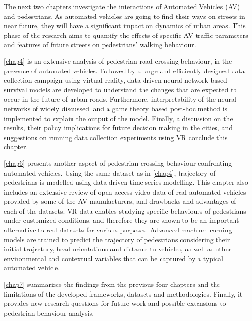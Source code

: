 The next two chapters investigate the interactions of Automated Vehicles (AV) and pedestrians. As automated vehicles are going to find their ways on streets in near future, they will have a significant impact on dynamics of urban areas. This phase of the research aims to quantify the effects of specific AV traffic parameters and features of future streets on pedestrians' walking behaviour.

\cref{chap4} is an extensive analysis of pedestrian road crossing behaviour, in the presence of automated vehicles. Followed by a large and efficiently designed data collection campaign using virtual reality, data-driven neural network-based survival models are developed to understand the changes that are expected to occur in the future of urban roads. Furthermore, interpretability of the neural networks of widely discussed, and a game theory based post-hoc method is implemented to explain the output of the model. Finally, a discussion on the results, their policy implications for future decision making in the cities, and suggestions on running data collection experiments using VR conclude this chapter.

\cref{chap6} presents another aspect of pedestrian crossing behaviour confronting automated vehicles. Using the same dataset as in \cref{chap4}, trajectory of pedestrians is modelled using data-driven time-series modelling. This chapter also includes an extensive review of open-access video data of real automated vehicles provided by some of the AV manufacturers, and drawbacks and advantages of each of the datasets. VR data enables studying specific behaviours of pedestrians under customized conditions, and therefore they are shown to be an important alternative to real datasets for various purposes. Advanced machine learning models are trained to predict the trajectory of pedestrians considering their initial trajectory, head orientations and distance to vehicles, as well as other environmental and contextual variables that can be captured by a typical automated vehicle. 

\cref{chap7} summarizes the findings from the previous four chapters and the limitations of the developed frameworks, datasets and methodologies.
Finally, it provides new research questions for future work and possible extensions to pedestrian behaviour analysis.



